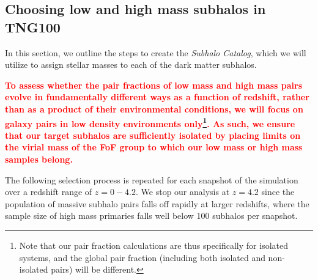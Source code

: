 \documentclass[linenumbers,twocolumn]{aastex631}
\newcommand{\add}[1]{\textcolor{red}{\textbf{#1}}}
\newcommand{\subcat}{\textit{Subhalo Catalog}}
\begin{document}

    \subsection{Choosing low and high mass subhalos in TNG100} \label{sec:methods-halos}

    In this section, we outline the steps to create the \subcat, which we will utilize to assign stellar masses to each of the dark matter subhalos. 

    \add{To assess whether the pair fractions of low mass and high mass pairs evolve in fundamentally different ways as a function of redshift, rather than as a product of their environmental conditions, we will focus on galaxy pairs in low density environments only\footnote{Note that our pair fraction calculations are thus specifically for isolated systems, and the global pair fraction (including both isolated and non-isolated pairs) will be different.}.
    As such, we ensure that our target subhalos are sufficiently isolated by placing limits on the virial mass of the FoF group to which our low mass or high mass samples belong.}
    

    The following selection process is repeated for each snapshot of the simulation over a redshift range of $z=0-4.2$.  
    We stop our analysis at $z=4.2$ since the population of massive subhalo pairs falls off rapidly at larger redshifts, where the sample size of high mass primaries falls well below 100 subhalos per snapshot.
    
\end{document}
